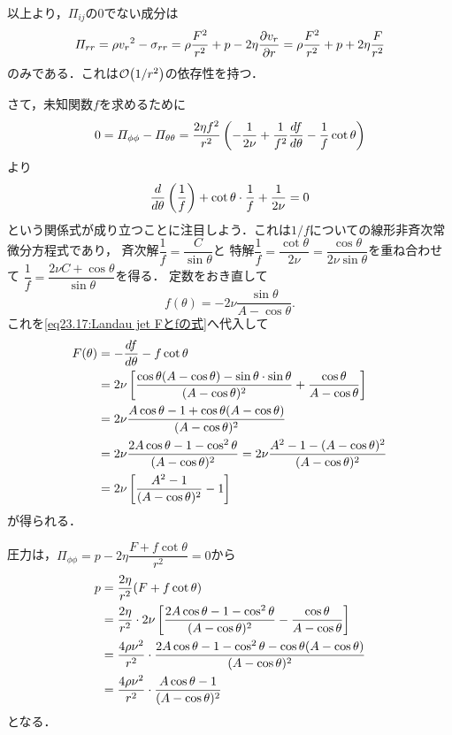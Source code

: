 以上より，$\varPi_{ij}$の0でない成分は
\[
    \varPi_{rr} = \rho {v_r}^2 - \sigma_{rr}
    = \rho\frac{F^2}{r^2} + p - 2\eta\pdv{v_r}{r}
    = \rho\frac{F^2}{r^2} + p + 2\eta\frac{F}{r^2}
\]
のみである．これは$\order{1/r^2}$の依存性を持つ．


さて，未知関数$f$を求めるために
\[
    0 = \varPi_{\phi\phi} - \varPi_{\theta\theta}
    = \frac{2\eta f^2}{r^2} \left( - \frac{1}{2\nu} + \frac{1}{f^2} \dv{f}{\theta} - \frac{1}{f} \cot\theta \right)
\]
より
\[
    \dv{\theta} \left( \frac{1}{f} \right) + \cot\theta \cdot \frac{1}{f} + \frac{1}{2\nu} = 0
\]
という関係式が成り立つことに注目しよう．これは$1/f$についての線形非斉次常微分方程式であり，
斉次解$\dfrac{1}{f} = \dfrac{C}{\sin\theta}$と
特解$\dfrac{1}{f} = \dfrac{\cot\theta}{2\nu} = \dfrac{\cos\theta}{2\nu \sin\theta}$を重ね合わせて
$\dfrac{1}{f} = \dfrac{2\nu C + \cos\theta}{\sin\theta}$を得る．
定数をおき直して
\begin{equation}
    f(\theta) = -2\nu \frac{\sin\theta}{A - \cos\theta} .
\end{equation}
これを\eqref{eq23.17:Landau jet Fとfの式}へ代入して
\begin{align}
    F(\theta) &= - \dv{f}{\theta} - f \cot \theta \notag \\
    &= 2\nu \left[ \frac{\cos\theta(A-\cos\theta) - \sin\theta \cdot \sin\theta}{(A-\cos\theta)^2} + \frac{\cos\theta}{A-\cos\theta} \right] \notag \\
    &= 2\nu \frac{A\cos\theta - 1 + \cos\theta(A-\cos\theta)}{(A-\cos\theta)^2} \notag \\
    &= 2\nu \frac{2A\cos\theta - 1 - \cos^2\theta}{(A-\cos\theta)^2} = 2\nu \frac{A^2-1-(A-\cos\theta)^2}{(A-\cos\theta)^2} \notag \\
    &= 2\nu \left[ \frac{A^2-1}{(A-\cos\theta)^2} -1 \right]
\end{align}
が得られる．



圧力は，$\varPi_{\phi\phi} = p - 2\eta \dfrac{F+f\cot\theta}{r^2}=0$から
\begin{align}
    p &= \frac{2\eta}{r^2} (F+f\cot\theta) \notag \\
    &= \frac{2\eta}{r^2} \cdot 2\nu \left[ \frac{2A\cos\theta - 1 - \cos^2\theta}{(A-\cos\theta)^2} - \frac{\cos\theta}{A - \cos\theta} \right] \notag \\
    &= \frac{4\rho\nu^2}{r^2} \cdot \frac{2A\cos\theta -1 -\cos^2\theta -\cos\theta(A-\cos\theta)}{(A-\cos\theta)^2} \notag \\
    &= \frac{4\rho\nu^2}{r^2} \cdot \frac{A\cos\theta-1}{(A-\cos\theta)^2}
\end{align}
となる．

